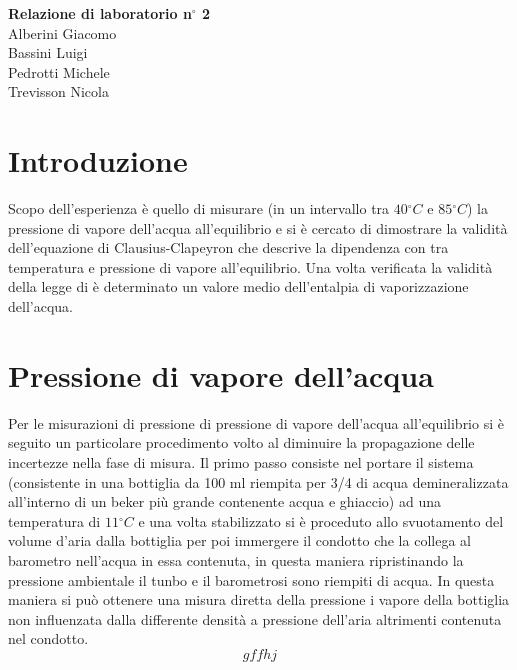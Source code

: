 \documentclass[a4paper,11pt]{article}
\begin{document}
\begin{center}
\textbf{\huge Relazione di laboratorio n\ensuremath{^\circ} 2} \\ \vspace{10pt}
\large Alberini Giacomo \\ Bassini Luigi \\ Pedrotti Michele \\ Trevisson Nicola 
\end{center}

\section{Introduzione}
Scopo dell'esperienza è quello di misurare (in un intervallo tra $40\ensuremath{^\circ}C$ e $85\ensuremath{^\circ}C$) la pressione di vapore dell'acqua all'equilibrio e si è cercato di dimostrare la validità dell'equazione di Clausius-Clapeyron che descrive la dipendenza con tra temperatura e pressione di vapore all'equilibrio.
Una volta verificata la validità della legge di è determinato un valore medio dell'entalpia di vaporizzazione dell'acqua.

\section{Pressione di vapore dell'acqua}

Per le misurazioni di pressione di pressione di vapore dell'acqua all'equilibrio si è seguito un particolare procedimento volto al diminuire la propagazione delle incertezze nella fase di misura.
Il primo passo consiste nel portare il sistema (consistente in una bottiglia da 100 ml riempita per 3/4 di acqua demineralizzata all'interno di un beker più grande contenente acqua e ghiaccio) ad una temperatura di $11\ensuremath{^\circ}C$ e una volta stabilizzato si è proceduto allo svuotamento del volume d'aria dalla bottiglia per poi immergere il condotto che la collega al barometro nell'acqua in essa contenuta, in questa maniera ripristinando la pressione ambientale il tunbo e il barometrosi sono riempiti di acqua. In questa maniera si può ottenere una misura diretta della pressione i vapore della bottiglia non influenzata dalla differente densità a pressione dell'aria altrimenti contenuta nel condotto.
 $$ gffhj $$
 
\end{document}
